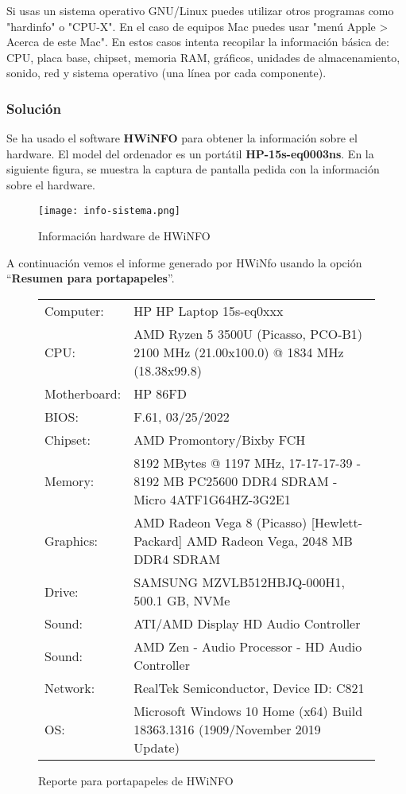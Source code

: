 Si usas un sistema operativo GNU/Linux puedes utilizar otros programas como "hardinfo" o "CPU-X". En el caso de equipos Mac puedes usar "menú Apple > Acerca de este Mac". En estos casos intenta recopilar la información básica de: CPU, placa base, chipset, memoria RAM, gráficos, unidades de almacenamiento, sonido, red y sistema operativo (una línea por cada componente).

\subsubsection{Solución}
Se ha usado el software \textbf{HWiNFO} para obtener la información sobre el hardware. El model del ordenador es un portátil \textbf{HP-15s-eq0003ns}. En la siguiente figura, se muestra la captura de pantalla pedida con la información sobre el hardware.

\begin{figure}[ht]
    \centering
    \texttt{[image: info-sistema.png]}
    \caption{Información hardware de HWiNFO}
\end{figure}

A continuación vemos el informe generado por HWiNfo usando la opción ``\textbf{Resumen para portapapeles}''.

\begin{figure}[ht]
    \begin{tcolorbox}[sharp corners, colback=yellow!30, colframe=white!20]
\begin{center}
    \begin{tabular}{p{6em} p{31em}}
        Computer:   &  HP HP Laptop 15s-eq0xxx \\
        CPU:        &  AMD Ryzen 5 3500U (Picasso, PCO-B1) 2100 MHz (21.00x100.0) @ 1834 MHz (18.38x99.8) \\
        Motherboard:&  HP 86FD  \\
        BIOS:       &  F.61, 03/25/2022 \\
        Chipset:    &  AMD Promontory/Bixby FCH \\
        Memory:     &  8192 MBytes @ 1197 MHz, 17-17-17-39 - 8192 MB PC25600 DDR4 SDRAM - Micro 4ATF1G64HZ-3G2E1 \\
        Graphics:   &  AMD Radeon Vega 8 (Picasso) [Hewlett-Packard] AMD Radeon Vega, 2048 MB DDR4 SDRAM \\
        Drive:      &  SAMSUNG MZVLB512HBJQ-000H1, 500.1 GB, NVMe \\
        Sound:      &  ATI/AMD Display HD Audio Controller \\
        Sound:      &  AMD Zen - Audio Processor - HD Audio Controller \\
        Network:    &  RealTek Semiconductor, Device ID: C821 \\
        OS:         &  Microsoft Windows 10 Home (x64) Build 18363.1316 (1909/November 2019 Update) \\
    \end{tabular}
\end{center}
    \end{tcolorbox}
    \caption{Reporte para portapapeles de HWiNFO}
\end{figure}


